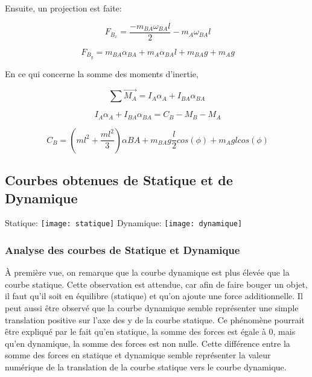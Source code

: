\documentclass{article}
\begin{document}
\noindent Ensuite, un projection est faite:

\begin{equation}
\ F_{B_x} = \frac{-m_{BA}\omega_{BA}l}{2} - m_A\omega_{BA}l 
\end{equation}

\begin{equation}
\ F_{B_y} = m_{BA}\alpha_{BA} + m_A\alpha_{BA}l + m_{BA}g + m_Ag
\end{equation}

\noindent En ce qui concerne la somme des moments d'inertie, 

\begin{equation}
\sum \overrightarrow{M_A} = I_A\alpha_A + I_{BA}\alpha_{BA}
\end{equation}

\begin{equation}
\ I_A\alpha_A + I_{BA}\alpha_{BA} = C_B - M_B - M_A
\end{equation}

\begin{equation}
\ C_B = (ml^2 + \frac{ml^2}{3})\alpha{BA}+ m_{BA}g\frac{l}{2}cos(\phi) + m_Aglcos(\phi)
\end{equation}

\subsection{Courbes obtenues de Statique et de Dynamique}
Statique:
\newline
\noindent \texttt{[image: statique]}
\newpage
\noindent Dynamique:
\newline
\noindent \texttt{[image: dynamique]}

\subsubsection{Analyse des courbes de Statique et Dynamique}
\noindent
À première vue, on remarque que la courbe dynamique est plus élevée que la courbe statique. Cette observation est attendue, car afin de faire bouger un objet, il faut qu'il soit en équilibre (statique) et qu'on ajoute une force additionnelle. Il peut aussi être observé que la courbe dynamique semble représenter une simple translation positive sur l'axe des y de la courbe statique. Ce phénomène pourrait être expliqué par le fait qu'en statique, la somme des forces est égale à 0, mais qu'en dynamique, la somme des forces est non nulle. Cette différence entre la somme des forces en statique et dynamique semble représenter la valeur numérique de la translation de la courbe statique vers le courbe dynamique.
\end{document}
